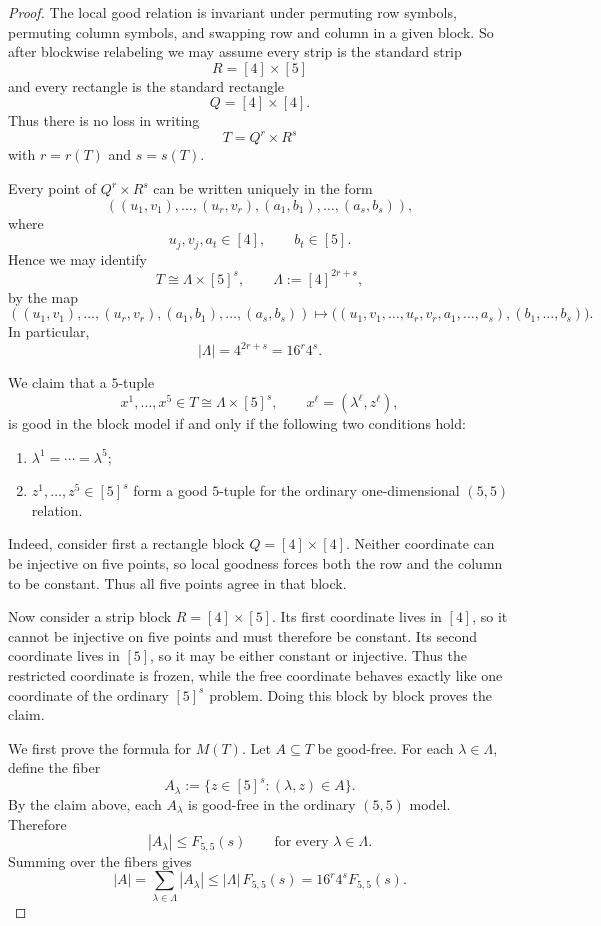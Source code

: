 \documentclass[11pt]{article}
\theoremstyle{definition}
\newcommand{\1}{\mathbf{1}}
\begin{document}
\begin{proof}
The local good relation is invariant under permuting row symbols, permuting column symbols, and swapping row and column in a given block.
So after blockwise relabeling we may assume every strip is the standard strip
\[
R=[4]\times[5]
\]
and every rectangle is the standard rectangle
\[
Q=[4]\times[4].
\]
Thus there is no loss in writing
\[
T=Q^r\times R^s
\]
with $r=r(T)$ and $s=s(T)$.

Every point of $Q^r\times R^s$ can be written uniquely in the form
\[
((u_1,v_1),\dots,(u_r,v_r),(a_1,b_1),\dots,(a_s,b_s)),
\]
where
\[
u_j,v_j,a_t\in [4],
\qquad
b_t\in [5].
\]
Hence we may identify
\[
T\cong \Lambda\times [5]^s,
\qquad
\Lambda:=[4]^{2r+s},
\]
by the map
\[
((u_1,v_1),\dots,(u_r,v_r),(a_1,b_1),\dots,(a_s,b_s))
\longmapsto
\bigl((u_1,v_1,\dots,u_r,v_r,a_1,\dots,a_s),(b_1,\dots,b_s)\bigr).
\]
In particular,
\[
|\Lambda|=4^{2r+s}=16^r4^s.
\]

We claim that a $5$-tuple
\[
x^1,\dots,x^5\in T\cong \Lambda\times [5]^s,
\qquad
x^\ell=(\lambda^\ell,z^\ell),
\]
is good in the block model if and only if the following two conditions hold:
\begin{enumerate}[label=(\roman*),leftmargin=2.2em]
\item $\lambda^1=\cdots=\lambda^5$;
\item $z^1,\dots,z^5\in [5]^s$ form a good $5$-tuple for the ordinary one-dimensional $(5,5)$ relation.
\end{enumerate}

Indeed, consider first a rectangle block $Q=[4]\times [4]$.
Neither coordinate can be injective on five points, so local goodness forces both the row and the column to be constant.
Thus all five points agree in that block.

Now consider a strip block $R=[4]\times [5]$.
Its first coordinate lives in $[4]$, so it cannot be injective on five points and must therefore be constant.
Its second coordinate lives in $[5]$, so it may be either constant or injective.
Thus the restricted coordinate is frozen, while the free coordinate behaves exactly like one coordinate of the ordinary $[5]^s$ problem.
Doing this block by block proves the claim.

We first prove the formula for $M(T)$.
Let $A\subseteq T$ be good-free.
For each $\lambda\in \Lambda$, define the fiber
\[
A_\lambda:=\{z\in [5]^s:(\lambda,z)\in A\}.
\]
By the claim above, each $A_\lambda$ is good-free in the ordinary $(5,5)$ model.
Therefore
\[
|A_\lambda|\le F_{5,5}(s)
\qquad\text{for every }\lambda\in \Lambda.
\]
Summing over the fibers gives
\[
|A|=\sum_{\lambda\in \Lambda}|A_\lambda|
\le |\Lambda|\,F_{5,5}(s)
=16^r4^sF_{5,5}(s).
\]


\end{proof}
\end{document}
